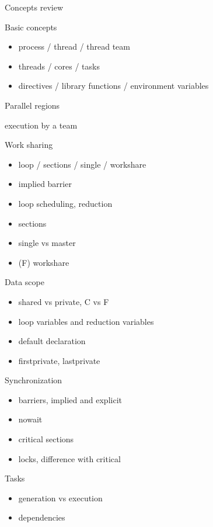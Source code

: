  {Concepts review}

\begin{multicols}{2}
 {Basic concepts}

\begin{itemize}
\item
process / thread / thread team
\item
threads / cores / tasks
\item
directives / library functions / environment variables
\end{itemize}

 {Parallel regions}

execution by a team

 {Work sharing}

\begin{itemize}
\item
loop / sections / single / workshare
\item
implied barrier
\item
loop scheduling, reduction
\item
sections
\item
single vs master
\item
(F) workshare
\end{itemize}

 {Data scope}

\begin{itemize}
\item
shared vs private, C vs F
\item
loop variables and reduction variables
\item
default declaration
\item
firstprivate, lastprivate
\end{itemize}

 {Synchronization}

\begin{itemize}
\item
barriers, implied and explicit
\item
nowait
\item
critical sections
\item
locks, difference with critical
\end{itemize}

 {Tasks}

\begin{itemize}
\item
generation vs execution
\item
dependencies
\end{itemize}


\end{multicols}

